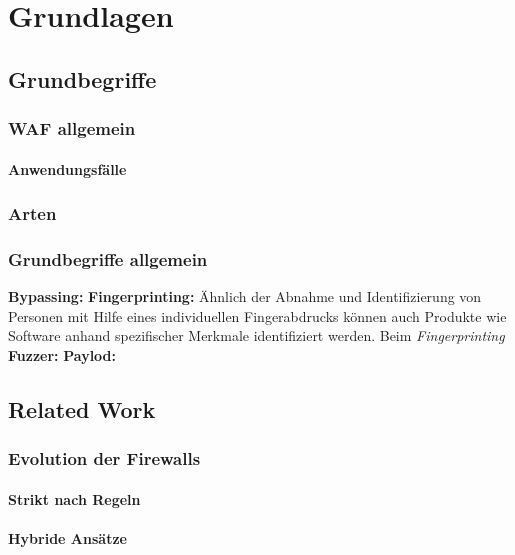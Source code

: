 \chapter{Grundlagen}


\section{Grundbegriffe}
\subsection{WAF allgemein}
\subsubsection{Anwendungsfälle}

\subsection{Arten}

\subsection{Grundbegriffe allgemein}
\textbf{Bypassing:}
\textbf{Fingerprinting:} Ähnlich der Abnahme und Identifizierung von Personen mit Hilfe eines individuellen Fingerabdrucks können auch Produkte wie Software anhand spezifischer Merkmale identifiziert werden. Beim \emph{Fingerprinting}
\textbf{Fuzzer:}
\textbf{Paylod:}

\section{Related Work} %

\subsection{Evolution der Firewalls}

\subsubsection{Strikt nach Regeln}

\subsubsection{Hybride Ansätze}

